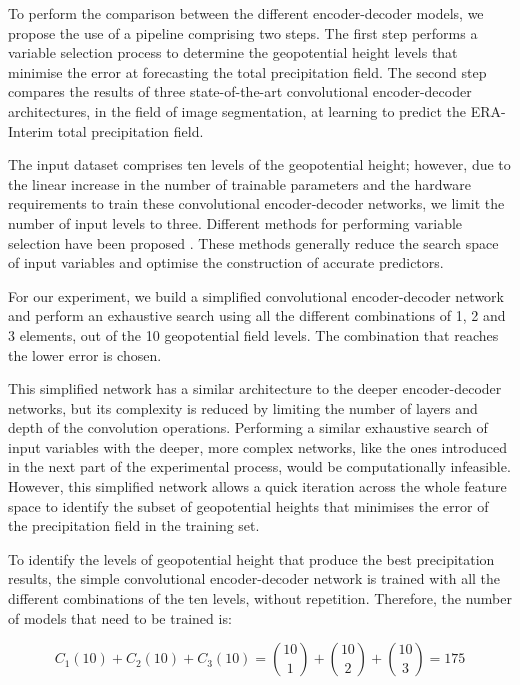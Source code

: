 \documentclass[twocol]{ametsoc}
\begin{document}
To perform the comparison between the different encoder-decoder models, we propose the use of a pipeline comprising two steps. The first step performs a variable selection process to determine the geopotential height levels that minimise the error at forecasting the total precipitation field. The second step compares the results of three state-of-the-art convolutional encoder-decoder architectures, in the field of image segmentation, at learning to predict the ERA-Interim total precipitation field.

The input dataset comprises ten levels of the geopotential height; however, due to the linear increase in the number of trainable parameters and the hardware requirements to train these convolutional encoder-decoder networks, we limit the number of input levels to three. Different methods for performing variable selection have been proposed \citep{saeys2007review}. These methods generally reduce the search space of input variables and optimise the construction of accurate predictors. 

For our experiment, we build a simplified convolutional encoder-decoder network and perform an exhaustive search using all the different combinations of 1, 2 and 3 elements, out of the 10 geopotential field levels. The combination that reaches the lower error is chosen. 

This simplified network has a similar architecture to the deeper encoder-decoder networks, but its complexity is reduced by limiting the number of layers and depth of the convolution operations. Performing a similar exhaustive search of  input variables with the deeper, more complex networks, like the ones introduced in the next part of the experimental process, would be computationally infeasible. However, this simplified network allows a quick iteration across the whole feature space to identify the subset of geopotential heights that minimises the error of the precipitation field in the training set.

To identify the levels of geopotential height that produce the best precipitation results, the simple convolutional encoder-decoder network is trained with all the different combinations of the ten levels, without repetition. Therefore, the number of models that need to be trained is:

\begin{equation}
C_1(10) + C_2(10) + C_3(10) = \binom{10}{1} + \binom{10}{2} + \binom{10}{3} = 175
\end{equation}
\end{document}
